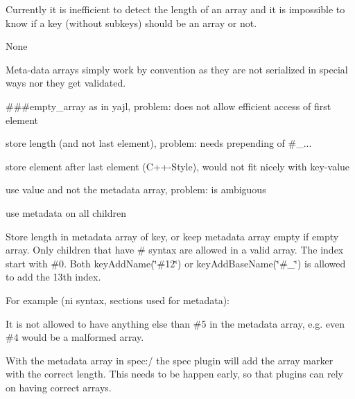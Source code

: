 Currently it is inefficient to detect the length of an array and it is impossible to know if a key (without subkeys) should be an array or not.


\begin{DoxyItemize}
\item None
\end{DoxyItemize}


\begin{DoxyItemize}
\item Meta-\/data arrays simply work by convention as they are not serialized in special ways nor they get validated.
\item {\ttfamily \#\#\#empty\+\_\+array} as in {\ttfamily yajl}, problem\+: does not allow efficient access of first element
\item store length (and not last element), problem\+: needs prepending of {\ttfamily \#\+\_\+...}
\item store element after last element (C++-\/\+Style), would not fit nicely with key-\/value
\item use value and not the metadata {\ttfamily array}, problem\+: is ambiguous
\item use metadata on all children
\end{DoxyItemize}

Store length in metadata {\ttfamily array} of key, or keep metadata {\ttfamily array} empty if empty array. Only children that have {\ttfamily \#} syntax are allowed in a valid array. The index start with {\ttfamily \#0}. Both {\ttfamily key\+Add\+Name(\char`\"{}\#12\char`\"{})} or {\ttfamily key\+Add\+Base\+Name(\char`\"{}\#\+\_\char`\"{})} is allowed to add the 13th index.

For example ({\ttfamily ni syntax}, sections used for metadata)\+:




It is not allowed to have anything else than {\ttfamily \#5} in the metadata {\ttfamily array}, e.\+g. even {\ttfamily \#4} would be a malformed array.

With the metadata {\ttfamily array} in {\ttfamily spec\+:/} the {\ttfamily spec} plugin will add the {\ttfamily array} marker with the correct length. This needs to be happen early, so that plugins can rely on having correct arrays.


